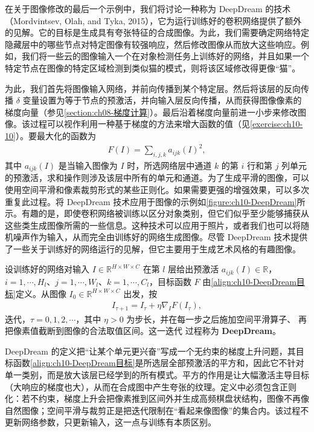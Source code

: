 \documentclass[../../main.tex]{subfiles}
\begin{document}
在关于图像修改的最后一个示例中，我们将讨论一种称为 DeepDream 的技术（Mordvintsev, Olah, and Tyka, 2015），它为运行训练好的卷积网络提供了额外的见解。它的目标是生成具有夸张特征的合成图像。为此，我们需要确定网络特定隐藏层中的哪些节点对特定图像有较强响应，然后修改图像从而放大这些响应。例如，我们将一些云的图像输入一个在对象检测任务上训练好的网络，并且如果一个特定节点在图像的特定区域检测到类似猫的模式，则将该区域修改得更像“猫”。

为此，我们首先将图像输入网络，并前向传播到某个特定层。然后将该层的反向传播 $\delta$ 变量设置为等于节点的预激活，并向输入层反向传播，从而获得图像像素的梯度向量（参见\cref{section:ch08-梯度计算}）。最后沿着梯度向量前进一小步来修改图像。该过程可以视作利用一种基于梯度的方法来增大函数的值（见\cref{exercise:ch10-10}）。要最大化的函数为
\begin{align}
  F(I)=\sum_{i,j,k}a_{ijk}(I)^2,
  \label{align:ch10-DeepDream目标}
\end{align}
其中 $a_{ijk}(I)$ 是当输入图像为 $I$ 时，所选网络层中通道 $k$ 的第 $i$ 行和第 $j$ 列单元的预激活，求和操作则涉及该层中所有的单元和通道。为了生成平滑的图像，可以使用空间平滑和像素裁剪形式的某些正则化。如果需要更强的增强效果，可以多次重复此过程。将 DeepDream 技术应用于图像的示例如\cref{figure:ch10-DeepDream}所示。有趣的是，即使卷积网络被训练以区分对象类别，但它们似乎至少能够捕获从这些类生成图像所需的一些信息。这种技术可以应用于照片，或者我们也可以将随机噪声作为输入，从而完全由训练好的网络生成图像。尽管 DeepDream 技术提供了一些关于训练好的网络运行的见解，但它主要用于生成艺术风格的有趣图像。

\begin{definition}[DeepDream]\label{definition:ch10-DeepDream}
设训练好的网络对输入 $I\in\mathbb{R}^{H\times W\times C}$ 在第 $l$ 层给出预激活
$a_{ijk}(I)\in\mathbb{R}$，$i=1,\cdots,H_l$、$j=1,\cdots,W_l$、$k=1,\cdots,C_l$，目标函数
$F$ 由\eqref{align:ch10-DeepDream目标}定义。从图像
$I_0\in\mathbb{R}^{H\times W\times C}$ 出发，按
\begin{align}
I_{\tau+1}=I_{\tau}+\eta\nabla_IF(I_{\tau}),
\label{align:ch10-DeepDream更新}
\end{align}
迭代，$\tau=0,1,2,\cdots$，其中 $\eta>0$ 为步长，并在每一步之后施加空间平滑算子、
再把像素值截断到图像的合法取值区间。这一迭代
过程称为 \textbf{DeepDream}。
\end{definition}

\begin{remark}
DeepDream 的定义把“让某个单元更兴奋”写成一个无约束的梯度上升问题，其目标函数\eqref{align:ch10-DeepDream目标}是所选层全部预激活的平方和，因此它不针对单一类别，而是放大该层已经学到的所有模式。平方的作用是让大幅激活主导目标（大响应的梯度也大），从而在合成图中产生夸张的纹理。定义中必须包含正则化：若不约束，梯度上升会把像素推到区间外并生成高频棋盘状结构，图像不再像自然图像；空间平滑与裁剪正是把迭代限制在“看起来像图像”的集合内。该过程不更新网络参数，只更新输入，这一点与训练有本质区别。
\end{remark}
\end{document}
